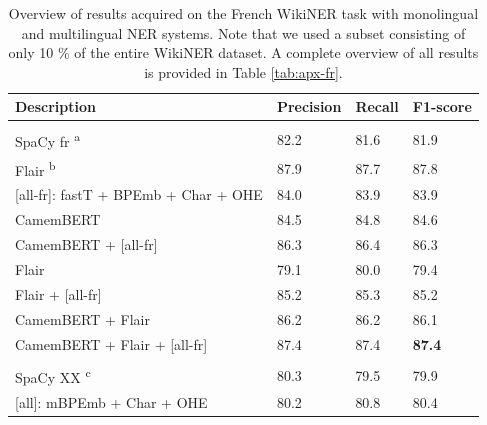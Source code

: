 \documentclass[12pt,a4paper,]{book}
\begin{document}
\begin{table}

\caption{\label{tab:wikiner-tab}Overview of results acquired on the French WikiNER task with monolingual and multilingual NER systems. Note that we used a subset consisting of only 10 \% of the entire WikiNER dataset. A complete overview of all results is provided in Table \ref{tab:apx-fr}.}
\centering
\begin{tabular}[t]{llll}
\toprule
Description & Precision & Recall & F1-score\\
\midrule
\addlinespace[0.3em]
\multicolumn{4}{l}{\textbf{Monolingual}}\\
\textcolor[HTML]{999999}{\hspace{1em}SpaCy fr \textsuperscript{a}} & \textcolor[HTML]{999999}{82.2} & \textcolor[HTML]{999999}{81.6} & \textcolor[HTML]{999999}{81.9}\\
\textcolor[HTML]{999999}{\hspace{1em}Flair \textsuperscript{b}} & \textcolor[HTML]{999999}{87.9} & \textcolor[HTML]{999999}{87.7} & \textcolor[HTML]{999999}{87.8}\\
\hspace{1em}[all-fr]: fastT + BPEmb + Char + OHE & 84.0 & 83.9 & 83.9\\
\hspace{1em}CamemBERT & 84.5 & 84.8 & 84.6\\
\hspace{1em}CamemBERT + [all-fr] & 86.3 & 86.4 & 86.3\\
\hspace{1em}Flair & 79.1 & 80.0 & 79.4\\
\hspace{1em}Flair + [all-fr] & 85.2 & 85.3 & 85.2\\
\hspace{1em}CamemBERT + Flair & 86.2 & 86.2 & 86.1\\
\hspace{1em}CamemBERT + Flair + [all-fr] & 87.4 & 87.4 & \textbf{87.4}\\
\addlinespace[0.3em]
\multicolumn{4}{l}{\textbf{Multilingual}}\\
\textcolor[HTML]{999999}{\hspace{1em}SpaCy XX \textsuperscript{c}} & \textcolor[HTML]{999999}{80.3} & \textcolor[HTML]{999999}{79.5} & \textcolor[HTML]{999999}{79.9}\\
\hspace{1em}[all]: mBPEmb + Char + OHE & 80.2 & 80.8 & 80.4\\

\end{tabular}
\end{table}
\end{document}

